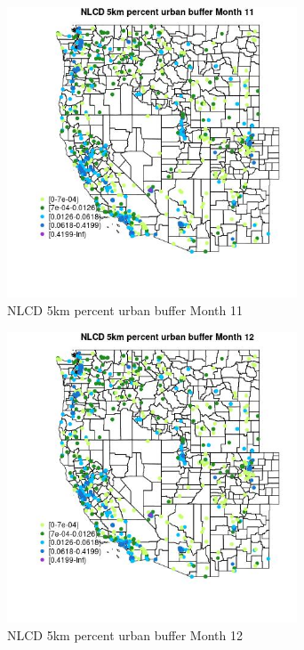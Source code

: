 \begin{figure} 
\centering  
\includegraphics[width=0.77\textwidth]{Code_Outputs/Report_ML_input_PM25_Step4_part_e_de_duplicated_aves_compiled_2019-05-21wNAs_MapObsMo11NLCD_5km_percent_urban_buffer.jpg} 
\caption{\label{fig:Report_ML_input_PM25_Step4_part_e_de_duplicated_aves_compiled_2019-05-21wNAsMapObsMo11NLCD_5km_percent_urban_buffer}NLCD 5km percent urban buffer Month 11} 
\end{figure} 
 

\begin{figure} 
\centering  
\includegraphics[width=0.77\textwidth]{Code_Outputs/Report_ML_input_PM25_Step4_part_e_de_duplicated_aves_compiled_2019-05-21wNAs_MapObsMo12NLCD_5km_percent_urban_buffer.jpg} 
\caption{\label{fig:Report_ML_input_PM25_Step4_part_e_de_duplicated_aves_compiled_2019-05-21wNAsMapObsMo12NLCD_5km_percent_urban_buffer}NLCD 5km percent urban buffer Month 12} 
\end{figure} 
 

